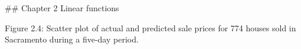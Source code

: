 

## Chapter 2 Linear functions

Figure 2.4: Scatter plot of actual and predicted sale prices for 774 houses sold in Sacramento during a five-day period.

